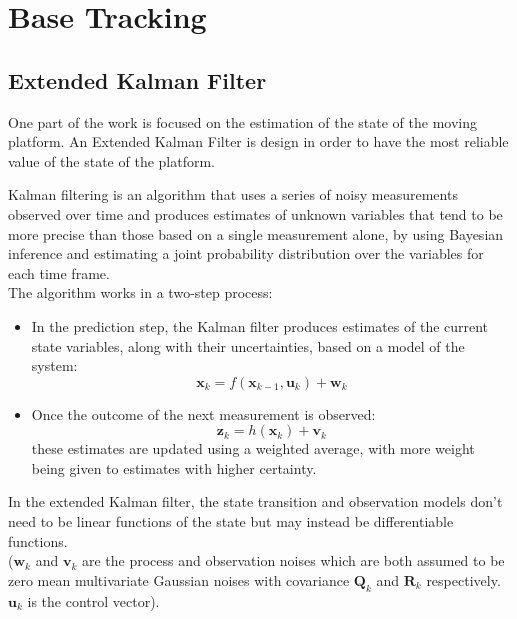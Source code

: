 \chapter{Base Tracking}\label{chap:base_tracking}


\section{Extended Kalman Filter}
One part of the work is focused on the estimation of the state of the moving platform.
An Extended Kalman Filter is design in order to have the most reliable value of the state of the platform.

Kalman filtering is an algorithm that uses a series of noisy measurements observed over time and produces estimates of unknown variables that tend to be more precise than those based on a single measurement alone, by using Bayesian inference and estimating a joint probability distribution over the variables for each time frame.\\
The algorithm works in a two-step process:
\begin{itemize}
\item In the prediction step, the Kalman filter produces estimates of the current state variables, along with their uncertainties, based on a model of the system:
\begin{equation}
\boldsymbol{x}_k = f(\boldsymbol{x}_{k-1},\boldsymbol{u}_k) + \boldsymbol{w}_k
\end{equation}
\item Once the outcome of the next measurement is observed:
\begin{equation}
\boldsymbol{z}_k = h(\boldsymbol{x}_{k}) + \boldsymbol{v}_k
\end{equation}
these estimates are updated using a weighted average, with more weight being given to estimates with higher certainty.
\end{itemize}
In the extended Kalman filter, the state transition and observation models don't need to be linear functions of the state but may instead be differentiable functions.\\
($\boldsymbol{w}_k$ and $\boldsymbol{v}_k$ are the process and observation noises which are both assumed to be zero mean multivariate Gaussian noises with covariance $\boldsymbol{Q}_k$ and $\boldsymbol{R}_k$ respectively. $\boldsymbol{u}_k$ is the control vector).

